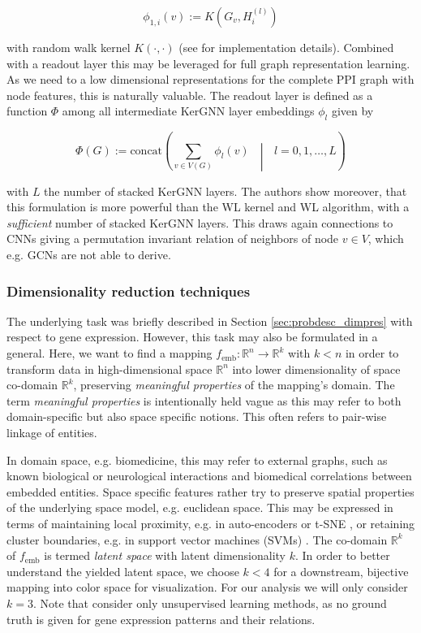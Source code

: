 \documentclass[]{article}
\renewcommand{\cite}{\citep}
\begin{document}
\begin{equation}
	\phi_{1,i}(v) := K\left(G_v, H_i^{(l)}\right)
\end{equation}

with random walk kernel $K(\cdot, \cdot)$ (see \citet{feng2022kergnns} for implementation details). Combined with a readout layer this may be leveraged for full graph representation learning. As we need to a low dimensional representations for the complete PPI graph with node features, this is naturally valuable. The readout layer is defined as a function $\Phi$ among all intermediate KerGNN layer embeddings $\phi_l$ given by 

\begin{equation}
	\label{equ:KerGNN}
	\Phi(G):= \text{concat}\left( \sum_{v\in V(G)} \phi_l(v) \text{ }\middle|\text{ } l=0,1,\dots, L \right)
\end{equation} 

with $L$ the number of stacked KerGNN layers. The authors show moreover, that this formulation is more powerful than the WL kernel and WL algorithm, with a \textit{sufficient} number of stacked KerGNN layers. This draws again connections to CNNs giving a permutation invariant relation of neighbors of node $v\in V$, which e.g. GCNs are not able to derive. 


\subsubsection{Dimensionality reduction techniques}
\label{sec:dim_red}

The underlying task was briefly described in Section \ref{sec:probdesc_dimpres} with respect to gene expression. However, this task may also be formulated in a general. Here, we want to find a mapping $f_\text{emb}:\mathbb{R}^n\rightarrow \mathbb{R}^k$ with $k<n$ in order to transform data in high-dimensional space $\mathbb{R}^n$ into lower dimensionality of space co-domain $\mathbb{R}^k$, preserving \textit{meaningful properties} of the mapping's domain. The term \textit{meaningful properties} is intentionally held vague as this may refer to both domain-specific but also space specific notions. This often refers to pair-wise linkage of entities.

In domain space, e.g. biomedicine, this may refer to external graphs, such as known biological or neurological interactions and biomedical correlations between embedded entities. Space specific features rather try to preserve spatial properties of the underlying space model, e.g. euclidean space. This may be expressed in terms of maintaining local proximity, e.g. in auto-encoders \cite{ng2011sparse} or t-SNE \cite{van2008visualizing}, or retaining cluster boundaries, e.g. in support vector machines (SVMs) \cite{noble2006support}. The co-domain $\mathbb{R}^k$ of $f_\text{emb}$ is termed \textit{latent space} with latent dimensionality $k$.
In order to better understand the yielded latent space, we choose $k<4$ for a downstream, bijective mapping into color space for visualization. For our analysis we will only consider $k=3$. Note that consider only unsupervised learning methods, as no ground truth is given for gene expression patterns and their relations.\\
\end{document}
